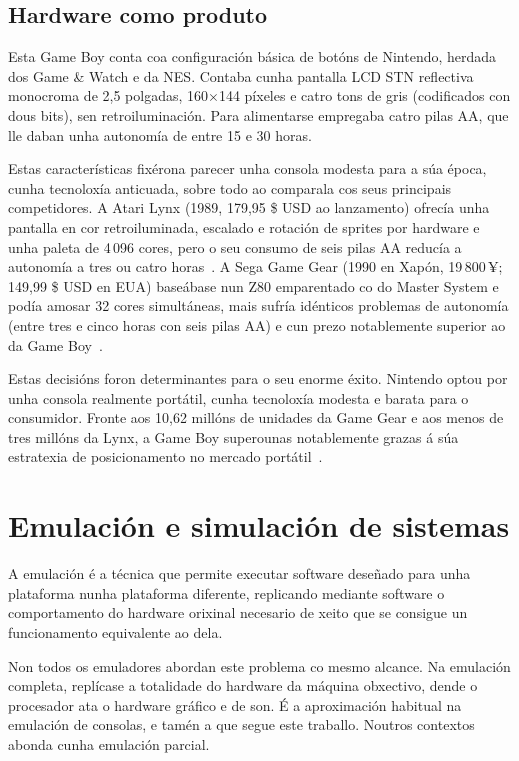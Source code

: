 \subsection{Hardware como produto}
Esta Game Boy conta coa configuración básica de botóns de Nintendo, herdada dos Game \& Watch e da NES.
Contaba cunha pantalla LCD STN reflectiva monocroma de 2,5 polgadas,
160$\times$144 píxeles e catro tons de gris (codificados con dous bits), sen retroiluminación.
Para alimentarse empregaba catro pilas AA, que lle daban unha autonomía de entre 15 e 30 horas.

Estas características fixérona parecer unha consola modesta para a súa época, cunha tecnoloxía anticuada,
sobre todo ao comparala cos seus principais competidores.
A Atari Lynx (1989, 179,95 \$ USD ao lanzamento) ofrecía unha pantalla en cor retroiluminada,
escalado e rotación de sprites por hardware e unha paleta de 4\,096 cores,
pero o seu consumo de seis pilas AA reducía a autonomía a tres ou catro horas~\cite{atari_lynx}.
A Sega Game Gear (1990 en Xapón, 19\,800\,¥; 149,99 \$ USD en EUA) baseábase nun Z80 emparentado co do
Master System e podía amosar 32 cores simultáneas,
mais sufría idénticos problemas de autonomía (entre tres e cinco horas con seis pilas AA)
e cun prezo notablemente superior ao da Game Boy~\cite{gamegear}.

Estas decisións foron determinantes para o seu enorme éxito. Nintendo optou por unha consola
realmente portátil, cunha tecnoloxía modesta e barata para o consumidor.
Fronte aos 10,62 millóns de unidades da Game Gear e aos menos de tres millóns da Lynx, a Game Boy superounas
notablemente grazas á súa estratexia de posicionamento no mercado portátil~\cite{gameboy}.


\section{Emulación e simulación de sistemas}

A emulación é a técnica que permite executar software deseñado para unha plataforma nunha plataforma diferente,
replicando mediante software o comportamento do hardware orixinal necesario de xeito que se consigue un funcionamento equivalente ao dela.

Non todos os emuladores abordan este problema co mesmo alcance.
Na emulación completa, replícase a totalidade do hardware da máquina obxectivo,
dende o procesador ata o hardware gráfico e de son.
É a aproximación habitual na emulación de consolas, e tamén a que segue este traballo.
Noutros contextos abonda cunha emulación parcial.

